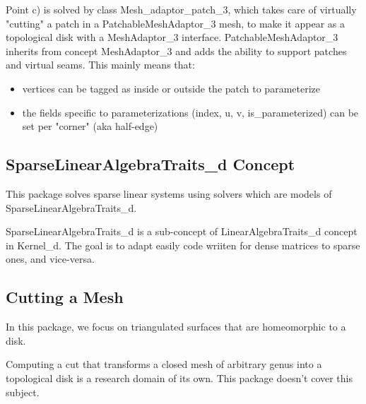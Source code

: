 Point c) is solved by class Mesh\_adaptor\_patch\_3, which takes care
of virtually "cutting"
a patch in a PatchableMeshAdaptor\_3 mesh, to make it appear as a topological disk
with a MeshAdaptor\_3 interface.
PatchableMeshAdaptor\_3 inherits from concept MeshAdaptor\_3 and adds
the ability to support patches and virtual seams.
This mainly means that:
\begin{itemize}
\item vertices can be tagged as inside or outside the patch to parameterize
\item the fields specific to parameterizations (index, u, v, is\_parameterized)
      can be set per "corner" (aka half-edge)
\end{itemize}


\subsection{SparseLinearAlgebraTraits\_d Concept}

This package solves sparse linear systems using solvers which are models
of SparseLinearAlgebraTraits\_d.

SparseLinearAlgebraTraits\_d is a sub-concept of LinearAlgebraTraits\_d concept
in Kernel\_d.
The goal is to adapt easily code wriiten for dense matrices to sparse ones,
and vice-versa.


\subsection{Cutting a Mesh}

In this package, we focus on triangulated surfaces that are homeomorphic to a
disk.

Computing a cut that transforms
a closed mesh of arbitrary genus into a topological disk is a research domain
of its own. This package doesn't cover this subject.



